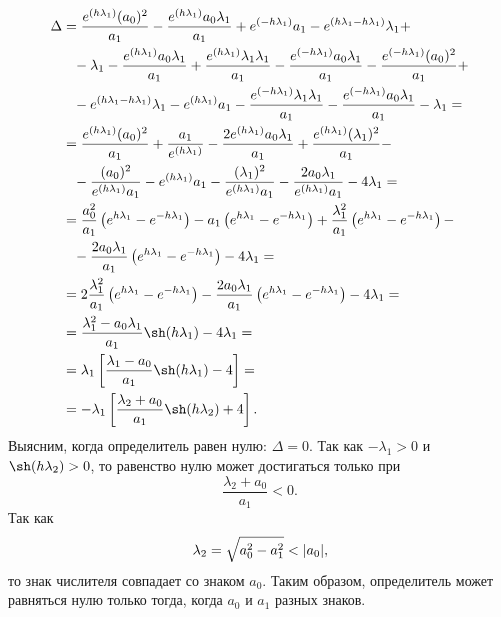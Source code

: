 \documentclass[a4paper,14pt]{article}
\begin{document}
\[
  \begin{aligned}
    \Delta
    &=
      \frac{e^{(h \lambda_1)} (a_0)^2}{a_1}
      - \frac{e^{(h \lambda_1)} a_0 \lambda_1}{a_1}
      + e^{(- h \lambda_1)} a_1
      - e^{(h \lambda_1 - h \lambda_1)} \lambda_1 + \\
    &\phantom{=}
      - \lambda_1 - \frac{e^{(h \lambda_1)} a_0 \lambda_1}{a_1}
      + \frac{e^{(h \lambda_1)} \lambda_1 \lambda_1}{a_1}
      - \frac{e^{(- h \lambda_1)} a_0 \lambda_1}{a_1}
      - \frac{e^{(- h \lambda_1)} (a_0)^2}{a_1} + \\
    &\phantom{=}
      - e^{(h \lambda_1 - h \lambda_1)} \lambda_1
      - e^{(h \lambda_1)} a_1
      - \frac{e^{(- h \lambda_1)} \lambda_1 \lambda_1}{a_1}
      - \frac{e^{(- h \lambda_1)} a_0 \lambda_1}{a_1}
      - \lambda_1 = \\
    &=
      \frac{e^{(h \lambda_1)} (a_0)^2}{a_1}
      + \frac{a_1}{e^{(h \lambda_1)}}
      - \frac{2 e^{(h \lambda_1)} a_0 \lambda_1}{a_1}
      + \frac{e^{(h \lambda_1)} (\lambda_1)^2}{a_1} - \\
    &\phantom{=}
      - \frac{(a_0)^2}{e^{(h \lambda_1)} a_1}
      - e^{(h \lambda_1)} a_1
      - \frac{(\lambda_1)^2}{e^{(h \lambda_1)} a_1}
      - \frac{2 a_0 \lambda_1}{e^{(h \lambda_1)} a_1}
      - 4 \lambda_1 = \\
    &=
      \frac{a_0^2}{a_1} \left(
      e^{h \lambda_1} - e^{-h \lambda_1}
      \right)
      - a_1 \left(
      e^{h \lambda_1} - e^{-h \lambda_1}
      \right)
      + \frac{\lambda_1^2}{a_1} \left(
      e^{h \lambda_1} - e^{-h \lambda_1}
      \right) - \\
    &\phantom{=}
      - \frac{2 a_0 \lambda_1}{a_1} \left(
      e^{h \lambda_1} - e^{-h \lambda_1}
      \right)
      - 4 \lambda_1 = \\
    &=
      2 \frac{\lambda_1^2}{a_1} \left(
      e^{h \lambda_1} - e^{-h \lambda_1}
      \right)
      - \frac{2 a_0 \lambda_1}{a_1} \left(
      e^{h \lambda_1} - e^{-h \lambda_1}
      \right)
      - 4 \lambda_1 = \\
    &=
      \frac{\lambda_1^2 - a_0 \lambda_1}{a_1}
      \sh (h \lambda_1)
      - 4 \lambda_1 = \\
    &= \lambda_1 \left[
      \frac{\lambda_1 - a_0}{a_1}
      \sh (h \lambda_1)
      - 4
      \right] = \\
    &= -\lambda_1 \left[
      \frac{\lambda_2 + a_0}{a_1}
      \sh (h \lambda_2)
      + 4
      \right].
  \end{aligned}
\]
Выясним, когда определитель равен нулю: $\Delta = 0$.
Так как $-\lambda_1 > 0$ и $\sh (h \lambda_2) > 0$, то
равенство нулю может достигаться только при
\[
  \frac{\lambda_2 + a_0}{a_1} < 0.
\]
Так как
\begin{equation*}
  \lambda_2 = \sqrt{a_0^2 - a_1^2} < \abs{a_0},
\end{equation*}
то знак числителя совпадает со знаком $a_0$. Таким образом,
определитель может равняться нулю только тогда, когда
$a_0$ и $a_1$ разных знаков.
\end{document}
